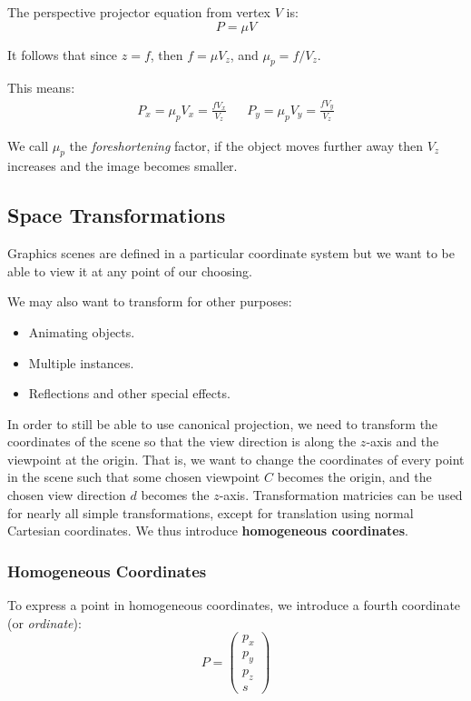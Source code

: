 \documentclass[11pt]{article}
\begin{document}
The perspective projector equation from vertex $V$ is:
\[
  P = \mu V
\]

It follows that since $z = f$, then $f = \mu V_z$, and $\mu_p = f / V_z$.

This means:
\begin{align*}
  P_x = \mu_p V_x = \frac{fV_x}{V_z} && P_y = \mu_p V_y = \frac{fV_y}{V_z}
\end{align*}

We call $\mu_p$ the \textit{foreshortening} factor, if the object moves further away then $V_z$ increases and the image becomes smaller.

\subsection{Space Transformations}
Graphics scenes are defined in a particular coordinate system but we want to be able to view it at any point of our choosing.

We may also want to transform for other purposes:
\begin{itemize}
  \item Animating objects.
  \item Multiple instances.
  \item Reflections and other special effects.
\end{itemize}

In order to still be able to use canonical projection, we need to transform the coordinates of the scene so that the view direction is along the $z$-axis and the viewpoint at the origin.
That is, we want to change the coordinates of every point in the scene such that some chosen viewpoint $C$ becomes the origin, and the chosen view direction $d$ becomes the $z$-axis.
Transformation matricies can be used for nearly all simple transformations, except for translation using normal Cartesian coordinates.
We thus introduce \textbf{homogeneous coordinates}.

\subsubsection{Homogeneous Coordinates}
To express a point in homogeneous coordinates, we introduce a fourth coordinate (or \textit{ordinate}):
\[
  P =
  \begin{pmatrix}
    p_x \\
    p_y \\
    p_z \\
    s
  \end{pmatrix}
\]
\end{document}
